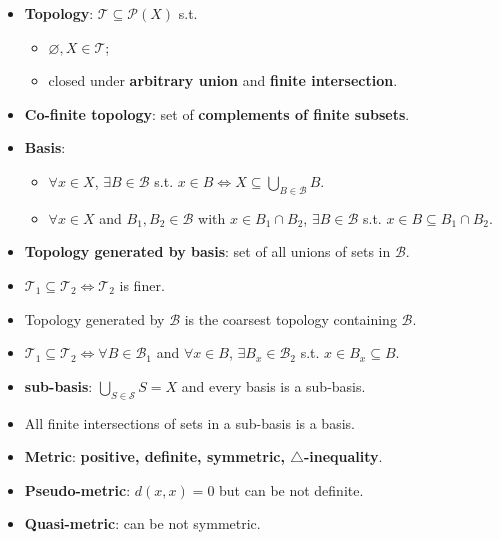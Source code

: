\documentclass[10pt]{article}
\begin{document}
    \begin{multicols*}{3}
        \begin{itemize}
            \item \textbf{Topology}: $\mathcal{T} \subseteq \mathcal{P}\left(X\right)$ s.t. 
            \begin{itemize}
                \item $\varnothing, X \in \mathcal{T}$;
                \item closed under \textbf{arbitrary union} and \textbf{finite intersection}.
            \end{itemize}
            \item \textbf{Co-finite topology}: set of \textbf{complements of finite subsets}.
            \item \textbf{Basis}: 
            \begin{itemize}
                \item $\forall x \in X$, $\exists B \in \mathcal{B}$ s.t. $x \in B \iff X \subseteq \bigcup_{B \in \mathcal{B}}B$.
                \item $\forall x \in X$ and $B_1, B_2 \in \mathcal{B}$ with $x \in B_1 \cap B_2$, $\exists B \in \mathcal{B}$ s.t. $x \in B \subseteq B_1 \cap B_2$.
            \end{itemize}
            \item \textbf{Topology generated by basis}: set of all unions of sets in $\mathcal{B}$.
            \item $\mathcal{T}_1 \subseteq \mathcal{T}_2 \iff \mathcal{T}_2$ is finer.
            \item Topology generated by $\mathcal{B}$ is the coarsest topology containing $\mathcal{B}$.
            \item $\mathcal{T}_1 \subseteq \mathcal{T}_2 \iff \forall B \in \mathcal{B}_1$ and $\forall x \in B$, $\exists B_x \in \mathcal{B}_2$ s.t. $x \in B_x \subseteq B$.
            \item \textbf{sub-basis}: $\bigcup_{S \in \mathcal{S}}S = X$ and every basis is a sub-basis.
            \item All finite intersections of sets in a sub-basis is a basis.
            \item \textbf{Metric}: \textbf{positive, definite, symmetric, $\triangle$-inequality}.
            \item \textbf{Pseudo-metric}: $d\left(x, x\right) = 0$ but can be not definite.
            \item \textbf{Quasi-metric}: can be not symmetric.

\end{itemize}
\end{multicols*}
\end{document}
